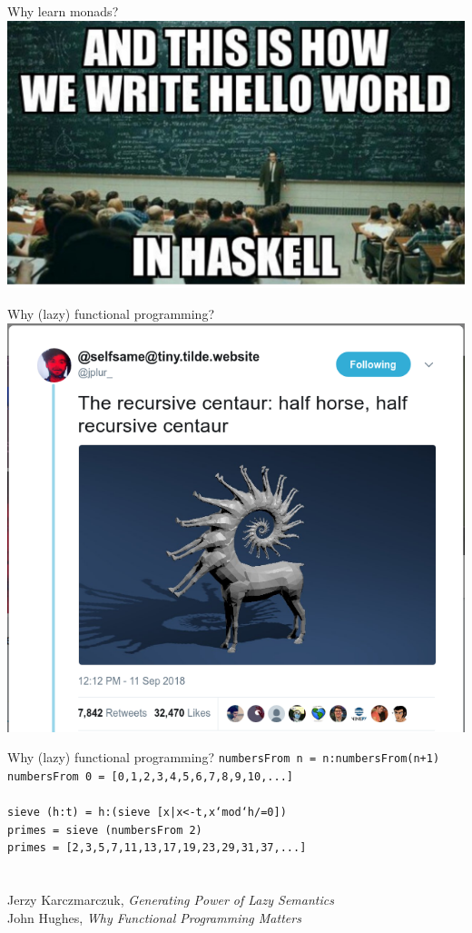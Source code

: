 \documentclass{beamer}
\begin{document}
\begin{frame}{Why learn monads?}
  \includegraphics[width=\textwidth]{hello-haskell.jpg}
\end{frame}


\begin{frame}{Why (lazy) functional programming?}
  \includegraphics[width=\textwidth]{recursive-centaur.png}
\end{frame}

\begin{frame}{Why (lazy) functional programming?}
  \texttt{numbersFrom n = n:numbersFrom(n+1)}\\ \pause
  \texttt{numbersFrom 0 = [0,1,2,3,4,5,6,7,8,9,10,...]}\\ \pause
  \ \\
  \texttt{sieve (h:t) = h:(sieve [x|x<-t,x`mod`h/=0])} \\ \pause
  \texttt{primes = sieve (numbersFrom 2)} \\ \pause
  \texttt{primes = [2,3,5,7,11,13,17,19,23,29,31,37,...]} \\ \pause
  \ \\ \
  \\ Jerzy Karczmarczuk, \textit{Generating Power of Lazy Semantics} \\ \pause  John Hughes, \textit{Why Functional Programming Matters}
\end{frame}
\end{document}
